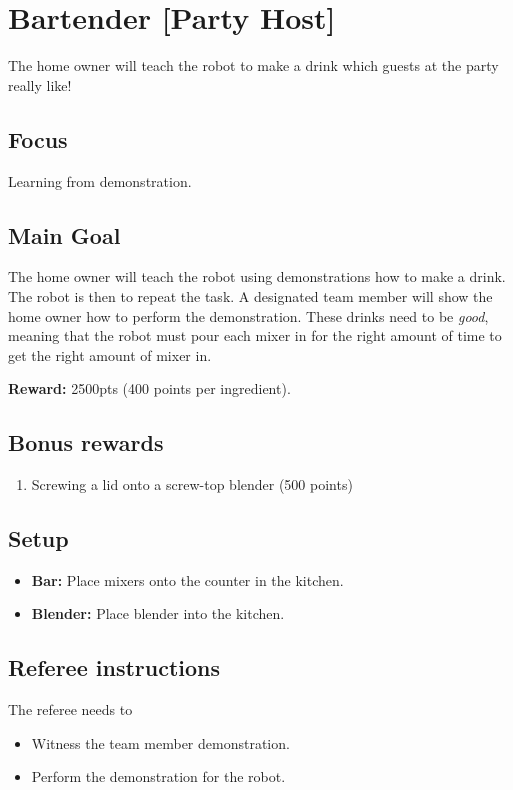 \section{Bartender [Party Host]}
The home owner will teach the robot to make a drink which guests at the party really like!

\subsection{Focus}
Learning from demonstration.

\subsection{Main Goal}
The home owner will teach the robot using demonstrations how to make a drink. The robot is then to repeat the task. A designated team member will show the home owner how to perform the demonstration. These drinks need to be \textit{good}, meaning that the robot must pour each mixer in for the right amount of time to get the right amount of mixer in.

\noindent\textbf{Reward:} 2500pts (400 points per ingredient).

\subsection{Bonus rewards}
\begin{enumerate}[nosep]
	\item Screwing a lid onto a screw-top blender (500 points)
\end{enumerate}


\subsection{Setup}
\begin{itemize}[nosep]
	\item \textbf{Bar:} Place mixers onto the counter in the kitchen.
	\item \textbf{Blender:} Place blender into the kitchen.
\end{itemize}

\subsection{Referee instructions}
The referee needs to
\begin{itemize}
	\item Witness the team member demonstration.
	\item Perform the demonstration for the robot.
\end{itemize}
